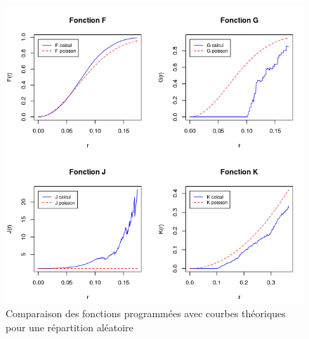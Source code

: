 \documentclass[stage2a]{tnreport}
\begin{document}
\cleardoublepage

\vspace*{2cm}
\begin{center}
\begin{figure}[h]
  \centering
  \includegraphics[scale=0.7]{figures/calcul&poisson.png}
  \caption{Comparaison des fonctions programmées avec courbes théoriques pour une répartition aléatoire}
  \label{fig:compPoisson}
\end{figure}
\end{center}

\cleardoublepage
\end{document}
